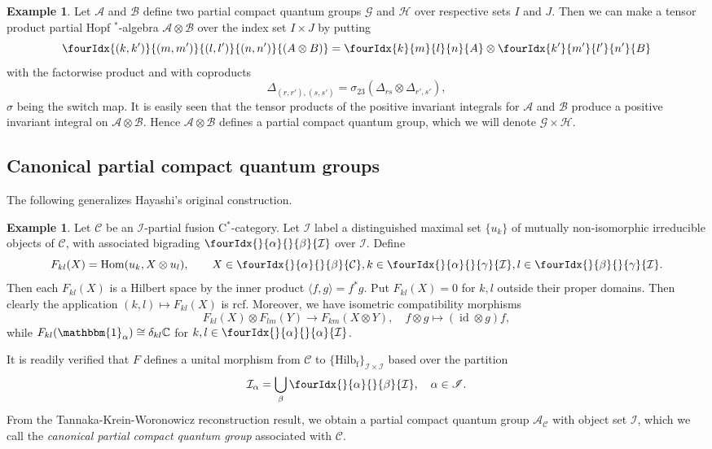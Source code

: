 \documentclass[11pt]{article}
\DeclareMathOperator{\fin}{\mathrm{f}}
\DeclareMathOperator{\id}{id}
\DeclareMathOperator{\Hom}{Hom}
\newcommand{\C}{\mathbb{C}}
\newcommand{\CatC}{\mathcal{C}}
\newcommand{\CatCC}{\mathscr{C}}
\newcommand{\Hilb}{\mathrm{Hilb}}
\newcommand{\Unitb}{\mathbbm{1}}
\newcommand{\Gr}[5]{\fourIdx{#2}{#4}{#3}{#5}{#1}}%
\newcommand{\Gru}[3]{\Gr{#1}{}{}{#2}{#3}}
\theoremstyle{definition}
\newtheorem{Exa}[Theorem]{Example}
\numberwithin{equation}{section}
\begin{document}
\begin{Exa} Let $\mathscr{A}$ and $\mathscr{B}$ define two partial compact quantum groups $\mathscr{G}$ and $\mathscr{H}$ over respective sets $I$ and $J$. Then we can make a tensor product partial Hopf $^*$-algebra $\mathscr{A}\otimes \mathscr{B}$ over the index set $I\times J$ by putting \[\Gr{(A\otimes B)}{(k,k')}{(l,l')}{(m,m')}{(n,n')} = \Gr{A}{k}{l}{m}{n}\otimes \Gr{B}{k'}{l'}{m'}{n'}\] with the factorwise product and with coproducts \[\Delta_{(r,r'),(s,s')} = \sigma_{23}(\Delta_{rs}\otimes \Delta_{r',s'}),\] $\sigma$ being the switch map. It is easily seen that the tensor products of the positive invariant integrals for $\mathscr{A}$ and $\mathscr{B}$ produce a positive invariant integral on $\mathscr{A}\otimes \mathscr{B}$. Hence $\mathscr{A}\otimes \mathscr{B}$ defines a partial compact quantum group, which we will denote $\mathscr{G}\times \mathscr{H}$.
\end{Exa}

\subsection{Canonical partial compact quantum groups} \label{SubSecCan}

The following generalizes Hayashi's original construction.

\begin{Exa} 
Let $\CatCC$ be an $\mathscr{I}$-partial fusion C$^*$-category. Let $\mathcal{I}$ label a distinguished maximal set $\{u_k\}$ of mutually non-isomorphic irreducible objects of $\CatC$, with associated bigrading $\Gru{\mathcal{I}}{\alpha}{\beta}$ over $\mathscr{I}$. Define \[F_{kl}(X)  = \Hom(u_k,  X\otimes u_l),\qquad X\in \Gru{\CatC}{\alpha}{\beta}, k\in \Gru{\mathcal{I}}{\alpha}{\gamma},l\in \Gru{\mathcal{I}}{\beta}{\gamma}.\] Then each $F_{kl}(X)$ is a Hilbert space by the inner product $\langle f,g\rangle = f^*g$. Put $F_{kl}(X) = 0$ for $k,l$ outside their proper domains. Then clearly the application $(k,l)\mapsto F_{kl}(X)$ is rcf. Moreover, we have isometric compatibility morphisms \[F_{kl}(X)\otimes F_{lm}(Y)\rightarrow F_{km}(X\otimes Y),\quad f\otimes g \mapsto (\id\otimes g)f,\] while $F_{kl}(\Unitb_{\alpha}) \cong \delta_{kl} \C$ for $k,l\in \Gru{\mathcal{I}}{\alpha}{\alpha}$. 

It is readily verified that $F$ defines a unital morphism from $\CatCC$ to $\{\Hilb_{\fin}\}_{\mathcal{I}\times \mathcal{I}}$ based over the partition \[\mathcal{I}_{\alpha} = \bigcup_{\beta} \Gru{\mathcal{I}}{\alpha}{\beta},\quad\alpha\in \mathscr{I}.\] From the Tannaka-Krein-Woronowicz reconstruction result, we obtain a partial compact quantum group $\mathscr{A}_{\CatCC}$ with object set $\mathcal{I}$, which we call the \emph{canonical partial compact quantum group} associated with $\CatCC$. 
\end{Exa} 
\end{document}
